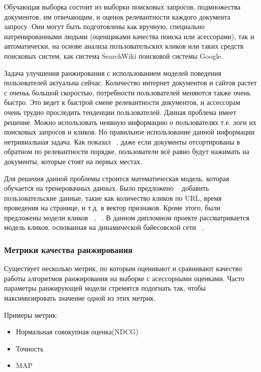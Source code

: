 Обучающая выборка состоит из выборки поисковых запросов, подмножества документов, им отвечающим, и оценок релевантности каждого документа запросу. Они могут быть подготовлены как вручную, специально натренированными людьми (оценщиками качества поиска или асессорами), так и автоматически, на основе анализа пользовательских кликов или таких средств поисковых систем, как система SearchWiki поисковой системы Google.

Задача улучшения ранжирования с использованием моделей поведения пользователей актуальна сейчас. Количество интернет документов и сайтов растет с оченьь большой скоростью, потребности пользователей меняются также очень быстро. Это ведет к быстрой смене релевантности документов, и ассессорам очень трудно проследить тенденции пользователей. Данная проблема имеет решение. Можно использовать неявную информацию о пользователях т.е. логи их поисковых запросов и кликов. Но правильное использование данной информации нетривиальная задача. Как показал ~\cite{joachims}, даже если документы отсортированы в обратном по релевантности порядке, пользователи всё равно будут нажимать на документы, которые стоят на первых местах.

Для решения данной проблемы строится математическая модель, которая обучается на тренеровачных данных. Было предложено ~\cite{ctr_improving1} добавить пользовательские данные, такие как количество кликов по URL, время проведения на странице, и т.д. в вектор признаков. 
Кроме этого, были предложены модели кликов ~\cite{ctr_improving2}, ~\cite{ccm}. В данном дипломном проекте рассматривается модель кликов, основанная на динамической байесовской сети ~\cite{dbn}.

\subsubsection{ Метрики качества ранжирования}

Существует несколько метрик, по которым оценивают и сравнивают качество работы алгоритмов ранжирования на выборке с асессорными оценками. Часто параметры ранжирующей модели стремятся подогнать так, чтобы максимизировать значение одной из этих метрик.

Примеры метрик:

\begin{itemize}
  \item Нормальная совокупная оценка(NDCG)
  \item Точность
  \item MAP
\end{itemize}

